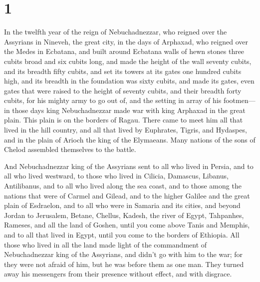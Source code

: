 \hypertarget{section}{%
\section{1}\label{section}}

 In the twelfth year of the reign of Nebuchadnezzar, who
reigned over the Assyrians in Nineveh, the great city, in the days of
Arphaxad, who reigned over the Medes in Ecbatana,  and
built around Ecbatana walls of hewn stones three cubits broad and six
cubits long, and made the height of the wall seventy cubits, and its
breadth fifty cubits,  and set its towers at its gates one
hundred cubits high, and its breadth in the foundation was sixty cubits,
 and made its gates, even gates that were raised to the
height of seventy cubits, and their breadth forty cubits, for his mighty
army to go out of, and the setting in array of his footmen---
 in those days king Nebuchadnezzar made war with king
Arphaxad in the great plain. This plain is on the borders of Ragau.
 There came to meet him all that lived in the hill
country, and all that lived by Euphrates, Tigris, and Hydaspes, and in
the plain of Arioch the king of the Elymaeans. Many nations of the sons
of Chelod assembled themselves to the battle.

 And Nebuchadnezzar king of the Assyrians sent to all who
lived in Persia, and to all who lived westward, to those who lived in
Cilicia, Damascus, Libanus, Antilibanus, and to all who lived along the
sea coast,  and to those among the nations that were of
Carmel and Gilead, and to the higher Galilee and the great plain of
Esdraelon,  and to all who were in Samaria and its cities,
and beyond Jordan to Jerusalem, Betane, Chellus, Kadesh, the river of
Egypt, Tahpanhes, Rameses, and all the land of Goshen, 
until you come above Tanis and Memphis, and to all that lived in Egypt,
until you come to the borders of Ethiopia.  All those who
lived in all the land made light of the commandment of Nebuchadnezzar
king of the Assyrians, and didn't go with him to the war; for they were
not afraid of him, but he was before them as one man. They turned away
his messengers from their presence without effect, and with disgrace.

